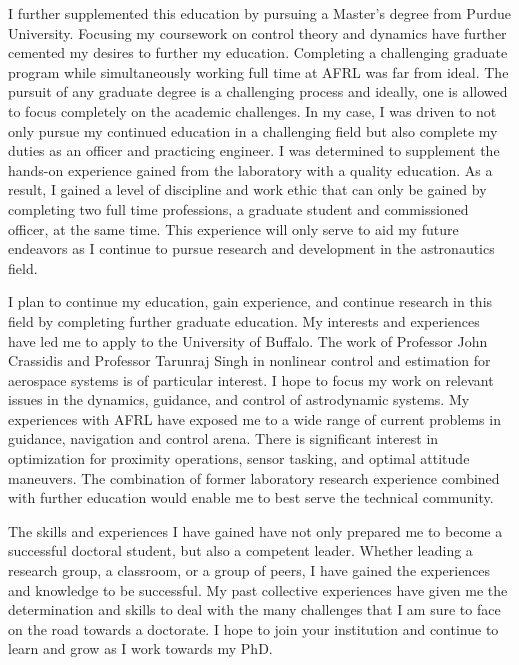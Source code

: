 \documentclass[12pt, oneside]{article}   	%
\begin{document}
I further supplemented this education by pursuing a Master's degree from Purdue University.
Focusing my coursework on control theory and dynamics have further cemented my desires to further my education.
Completing a challenging graduate program while simultaneously working full time at AFRL was far from ideal.
The pursuit of any graduate degree is a challenging process and ideally, one is allowed to focus completely on the academic challenges.
In my case, I was driven to not only pursue my continued education in a challenging field but also complete my duties as an officer and practicing engineer. 
I was determined to supplement the hands-on experience gained from the laboratory with a quality education.
As a result, I gained a level of discipline and work ethic that can only be gained by completing two full time professions, a graduate student and commissioned officer, at the same time.
This experience will only serve to aid my future endeavors as I continue to pursue research and development in the astronautics field.



I plan to continue my education, gain experience, and continue research in this field by completing further graduate education.   
My interests and experiences have led me to apply to the University of Buffalo. 
The work of Professor John Crassidis and Professor Tarunraj Singh in nonlinear control and estimation for aerospace systems is of particular interest. 
I hope to focus my work on relevant issues in the dynamics, guidance, and control of astrodynamic systems.  
My experiences with AFRL have exposed me to a wide range of current problems in guidance, navigation and control arena. 
There is significant interest in optimization for proximity operations, sensor tasking, and optimal attitude maneuvers.  
The combination of former laboratory research experience combined with further education would enable me to best serve the technical community.


The skills and experiences I have gained have not only prepared me to become a successful doctoral student, but also a competent leader.
Whether leading a research group, a classroom, or a group of peers, I have gained the experiences and knowledge to be successful. 
My past collective experiences have given me the determination and skills to deal with the many challenges that I am sure to face on the road towards a doctorate. 
I hope to join your institution and continue to learn and grow as I work towards my PhD.


\end{document}
